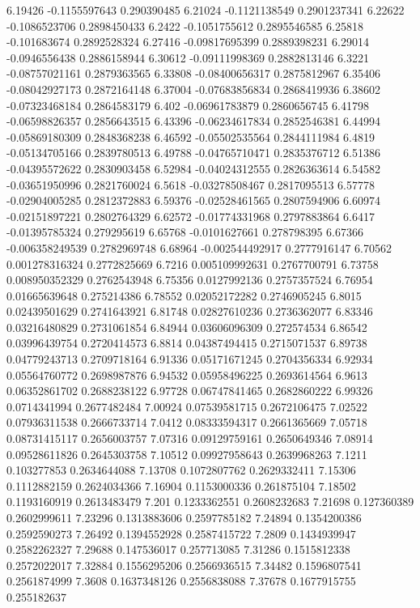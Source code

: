 {6.19426 -0.1155597643 0.290390485
6.21024 -0.1121138549 0.2901237341
6.22622 -0.1086523706 0.2898450433
6.2422 -0.1051755612 0.2895546585
6.25818 -0.101683674 0.2892528324
6.27416 -0.09817695399 0.2889398231
6.29014 -0.0946556438 0.2886158944
6.30612 -0.09111998369 0.2882813146
6.3221 -0.08757021161 0.2879363565
6.33808 -0.08400656317 0.2875812967
6.35406 -0.08042927173 0.2872164148
6.37004 -0.07683856834 0.2868419936
6.38602 -0.07323468184 0.2864583179
6.402 -0.06961783879 0.2860656745
6.41798 -0.06598826357 0.2856643515
6.43396 -0.06234617834 0.2852546381
6.44994 -0.05869180309 0.2848368238
6.46592 -0.05502535564 0.2844111984
6.4819 -0.05134705166 0.2839780513
6.49788 -0.04765710471 0.2835376712
6.51386 -0.04395572622 0.2830903458
6.52984 -0.04024312555 0.2826363614
6.54582 -0.03651950996 0.2821760024
6.5618 -0.03278508467 0.2817095513
6.57778 -0.02904005285 0.2812372883
6.59376 -0.02528461565 0.2807594906
6.60974 -0.02151897221 0.2802764329
6.62572 -0.01774331968 0.2797883864
6.6417 -0.01395785324 0.279295619
6.65768 -0.0101627661 0.278798395
6.67366 -0.006358249539 0.2782969748
6.68964 -0.002544492917 0.2777916147
6.70562 0.001278316324 0.2772825669
6.7216 0.005109992631 0.2767700791
6.73758 0.008950352329 0.2762543948
6.75356 0.0127992136 0.2757357524
6.76954 0.01665639648 0.275214386
6.78552 0.02052172282 0.2746905245
6.8015 0.02439501629 0.2741643921
6.81748 0.02827610236 0.2736362077
6.83346 0.03216480829 0.2731061854
6.84944 0.03606096309 0.272574534
6.86542 0.03996439754 0.2720414573
6.8814 0.04387494415 0.2715071537
6.89738 0.04779243713 0.2709718164
6.91336 0.05171671245 0.2704356334
6.92934 0.05564760772 0.2698987876
6.94532 0.05958496225 0.2693614564
6.9613 0.06352861702 0.2688238122
6.97728 0.06747841465 0.2682860222
6.99326 0.0714341994 0.2677482484
7.00924 0.07539581715 0.2672106475
7.02522 0.07936311538 0.2666733714
7.0412 0.08333594317 0.2661365669
7.05718 0.08731415117 0.2656003757
7.07316 0.09129759161 0.2650649346
7.08914 0.09528611826 0.2645303758
7.10512 0.09927958643 0.2639968263
7.1211 0.103277853 0.2634644088
7.13708 0.1072807762 0.2629332411
7.15306 0.1112882159 0.2624034366
7.16904 0.1153000336 0.261875104
7.18502 0.1193160919 0.2613483479
7.201 0.1233362551 0.2608232683
7.21698 0.127360389 0.2602999611
7.23296 0.1313883606 0.2597785182
7.24894 0.1354200386 0.2592590273
7.26492 0.1394552928 0.2587415722
7.2809 0.1434939947 0.2582262327
7.29688 0.147536017 0.257713085
7.31286 0.1515812338 0.2572022017
7.32884 0.1556295206 0.2566936515
7.34482 0.1596807541 0.2561874999
7.3608 0.1637348126 0.2556838088
7.37678 0.1677915755 0.255182637
}
